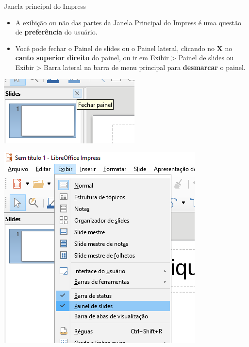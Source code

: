 \begin{frame}{Janela principal do Impress}
	\begin{block}{}
		\begin{itemize}
			\item A exibição ou não das partes da Janela Principal do Impress é uma questão de \textbf{preferência} do usuário.
			\item Você pode fechar o Painel de slides ou o Painel lateral, clicando no \textbf{X} no \textbf{canto superior direito} do painel, ou ir em Exibir > Painel de slides ou Exibir > Barra lateral na barra de menu principal para \textbf{desmarcar} o painel.
		\end{itemize}
	\end{block}

	\begin{minipage}{0.49\linewidth}
		\centering
		\includegraphics[width=1\linewidth]{Figuras/Ch05/fig4}
	\end{minipage}\hfill
	\begin{minipage}{0.49\linewidth}
		\centering
		\includegraphics[width=0.75\linewidth]{Figuras/Ch05/fig5}
	\end{minipage}
\end{frame}


